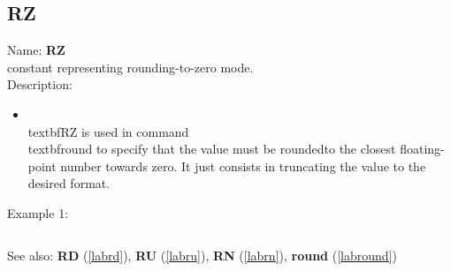 \subsection{RZ}
\label{labrz}
\noindent Name: \textbf{RZ}\\
constant representing rounding-to-zero mode.\\
\noindent Description: \begin{itemize}

\item \\textbf{RZ} is used in command \\textbf{round} to specify that the value must be rounded\n   to the closest floating-point number towards zero. It just consists in \n   truncating the value to the desired format.\n\end{itemize}
\noindent Example 1: 
\begin{center}\begin{minipage}{15cm}\begin{Verbatim}[frame=single]
\end{Verbatim}
\end{minipage}\end{center}
See also: \textbf{RD} (\ref{labrd}), \textbf{RU} (\ref{labru}), \textbf{RN} (\ref{labrn}), \textbf{round} (\ref{labround})
